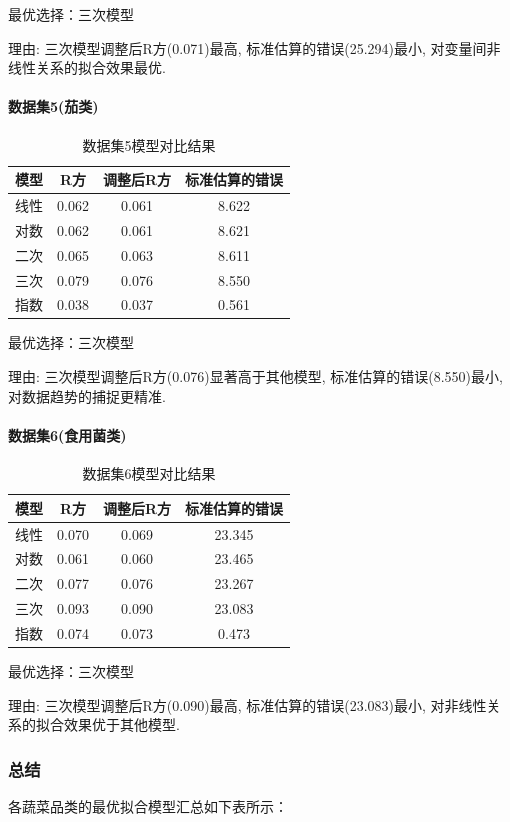 \documentclass{cumcmthesis}
\begin{document}
最优选择：三次模型

理由: 三次模型调整后R方(0.071)最高, 标准估算的错误(25.294)最小, 对变量间非线性关系的拟合效果最优. 


\paragraph{数据集5(茄类)}
\begin{table}[H]
\centering
\begin{tabular}{cccc}
\hline
模型 & R方 & 调整后R方 & 标准估算的错误 \\
\hline
线性 & 0.062 & 0.061 & 8.622 \\
对数 & 0.062 & 0.061 & 8.621 \\
二次 & 0.065 & 0.063 & 8.611 \\
三次 & 0.079 & 0.076 & 8.550 \\
指数 & 0.038 & 0.037 & 0.561 \\
\hline
\end{tabular}
\caption{数据集5模型对比结果}
\label{tab:dataset5}
\end{table}

最优选择：三次模型

理由: 三次模型调整后R方(0.076)显著高于其他模型, 标准估算的错误(8.550)最小, 对数据趋势的捕捉更精准. 


\paragraph{数据集6(食用菌类)}
\begin{table}[H]
\centering
\begin{tabular}{cccc}
\hline
模型 & R方 & 调整后R方 & 标准估算的错误 \\
\hline
线性 & 0.070 & 0.069 & 23.345 \\
对数 & 0.061 & 0.060 & 23.465 \\
二次 & 0.077 & 0.076 & 23.267 \\
三次 & 0.093 & 0.090 & 23.083 \\
指数 & 0.074 & 0.073 & 0.473 \\
\hline
\end{tabular}
\caption{数据集6模型对比结果}
\label{tab:dataset6}
\end{table}

最优选择：三次模型

理由: 三次模型调整后R方(0.090)最高, 标准估算的错误(23.083)最小, 对非线性关系的拟合效果优于其他模型. 


\subsubsection{总结}
各蔬菜品类的最优拟合模型汇总如下表所示：
\end{document}
